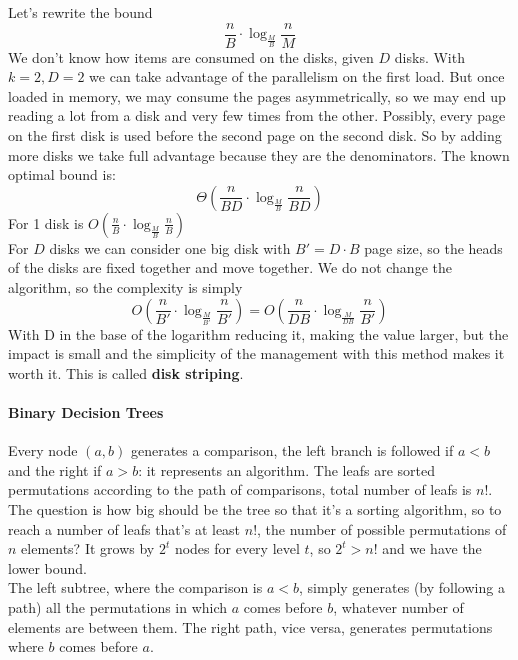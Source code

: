 \documentclass[10pt]{report}
\begin{document}
Let's rewrite the bound
$$\frac{n}{B}\cdot\log_{\frac{M}{B}}\frac{n}{M}$$
We don't know how items are consumed on the disks, given $D$ disks. With $k = 2, D = 2$ we can take advantage of the parallelism on the first load. But once loaded in memory, we may consume the pages asymmetrically, so we may end up reading a lot from a disk and very few times from the other. Possibly, every page on the first disk is used before the second page on the second disk. So by adding more disks we take full advantage because they are the denominators. The known optimal bound is:
$$\Theta\left(\frac{n}{BD}\cdot\log_{\frac{M}{B}}\frac{n}{BD}\right)$$
For 1 disk is $O(\frac{n}{B}\cdot\log_{\frac{M}{B}}\frac{n}{B})$\\
For $D$ disks we can consider one big disk with $B' = D\cdot B$ page size, so the heads of the disks are fixed together and move together. We do not change the algorithm, so the complexity is simply $$O\left(\frac{n}{B'}\cdot\log_{\frac{M}{B'}}\frac{n}{B'}\right) = O\left(\frac{n}{DB}\cdot\log_{\frac{M}{DB}}\frac{n}{B'}\right)$$ With D in the base of the logarithm reducing it, making the value larger, but the impact is small and the simplicity of the management with this method makes it worth it. This is called \textbf{disk striping}.
\paragraph{Binary Decision Trees} Every node $(a,b)$ generates a comparison, the left branch is followed if $a<b$ and the right if $a>b$: it represents an algorithm. The leafs are sorted permutations according to the path of comparisons, total number of leafs is $n!$. The question is how big should be the tree so that it's a sorting algorithm, so to reach a number of leafs that's at least $n!$, the number of possible permutations of $n$ elements? It grows by $2^t$ nodes for every level $t$, so $2^t > n!$ and we have the lower bound.\\
The left subtree, where the comparison is $a < b$, simply generates (by following a path) all the permutations in which $a$ comes before $b$, whatever number of elements are between them. The right path, vice versa, generates permutations where $b$ comes before $a$.
\end{document}
